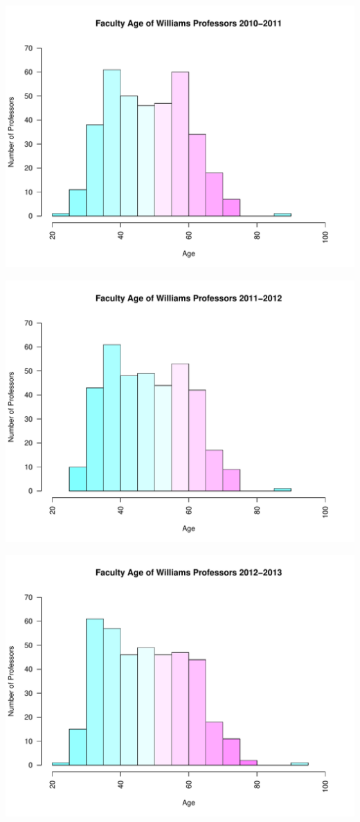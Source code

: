 \documentclass[12pt,a4paper]{article}\usepackage[]{graphicx}\usepackage[]{color}
\makeatletter
\def\maxwidth{ %
  \ifdim\Gin@nat@width>\linewidth
    \linewidth
  \else
    \Gin@nat@width
  \fi
}
\newenvironment{knitrout}{}{} %
\theoremstyle{definition}
\makeatother
\begin{document}
\begin{knitrout}
\includegraphics[width=\maxwidth]{figure/unnamed-chunk-9-7} 

\includegraphics[width=\maxwidth]{figure/unnamed-chunk-9-8} 

\includegraphics[width=\maxwidth]{figure/unnamed-chunk-9-9} 


\end{knitrout}
\end{document}
